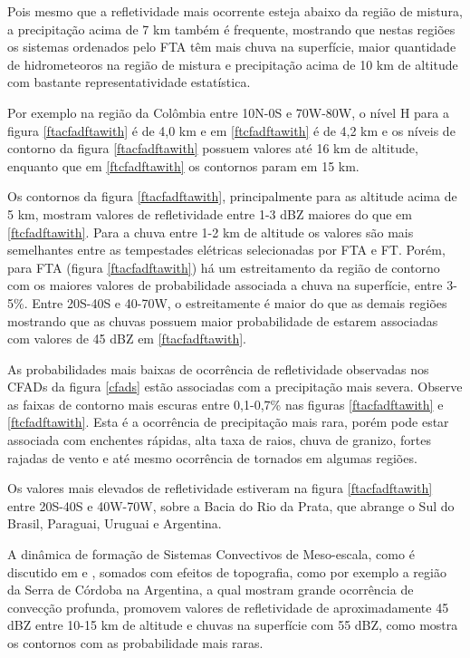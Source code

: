 Pois mesmo que a refletividade mais ocorrente esteja abaixo da região de mistura, a precipitação acima de 7 km também é frequente, mostrando que nestas regiões os sistemas ordenados pelo FTA têm mais chuva na superfície, maior quantidade de hidrometeoros na região de mistura e precipitação acima de 10 km de altitude com bastante representatividade estatística.



Por exemplo na região da Colômbia entre 10N-0S e 70W-80W, o nível H para a figura \ref{ftacfadftawith} é de 4,0 km e em \ref{ftcfadftawith} é de 4,2 km e os níveis de contorno da figura \ref{ftacfadftawith} possuem valores até 16 km de altitude, enquanto que em \ref{ftcfadftawith} os contornos param em 15 km. 





Os contornos da figura \ref{ftacfadftawith}, principalmente para as altitude acima de 5 km, mostram valores de refletividade entre 1-3 dBZ  maiores do que em \ref{ftcfadftawith}. Para a chuva entre 1-2 km de altitude os valores são mais semelhantes entre as tempestades elétricas selecionadas por FTA e FT. Porém, para FTA (figura \ref{ftacfadftawith}) há um estreitamento da região de contorno com os maiores valores de probabilidade associada a chuva na superfície, entre 3-5\%. Entre 20S-40S e 40-70W, o estreitamente é maior do que as demais regiões mostrando que as chuvas possuem maior probabilidade de estarem associadas com valores de 45 dBZ em \ref{ftacfadftawith}.      

As probabilidades mais baixas de ocorrência de refletividade observadas nos CFADs da figura \ref{cfads} estão associadas com a precipitação mais severa. Observe as faixas de contorno mais escuras entre 0,1-0,7\% nas figuras \ref{ftacfadftawith} e \ref{ftcfadftawith}. Esta é a ocorrência de precipitação mais rara, porém pode estar associada com enchentes rápidas, alta taxa de raios, chuva de granizo, fortes rajadas de vento e até mesmo ocorrência de tornados em algumas regiões. 

Os valores mais elevados de refletividade estiveram na figura \ref{ftacfadftawith} entre 20S-40S e 40W-70W, sobre a Bacia do Rio da Prata, que abrange o Sul do Brasil, Paraguai, Uruguai e Argentina. 

A dinâmica de formação de Sistemas Convectivos de Meso-escala, como é discutido em \cite{Velasco1987} e \cite{Durkee2009}, somados com efeitos de topografia, como por exemplo a região da Serra de Córdoba na Argentina, a qual \cite{Rasmussen2011} mostram grande ocorrência de convecção profunda, promovem valores de refletividade de aproximadamente 45 dBZ entre 10-15 km de altitude e chuvas na superfície com 55 dBZ, como mostra os contornos com as probabilidade mais raras.

